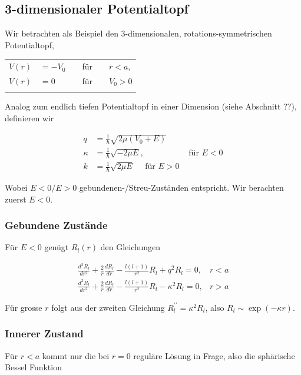 \documentclass[10pt, letterpaper]{article}
\begin{document}
\subsection*{3-dimensionaler Potentialtopf}
Wir betrachten als Beispiel den 3-dimensionalen, rotations-symmetrischen Potentialtopf,

\begin{center}
\begin{tabular}{rlrlrl}
$V(r)$ & $=-V_{0}$ &  & für &  & $r<a$, \\
$V(r)$ & $=0$ &  & für &  & $V_{0}>0$ \\
 &  &  &  &  &  \\
\hline
\end{tabular}
\end{center}

Analog zum endlich tiefen Potentialtopf in einer Dimension (siehe Abschnitt ??), definieren wir

$$
\begin{array}{rlr}
q & =\frac{1}{\hbar} \sqrt{2 \mu\left(V_{0}+E\right)} & \\
\kappa & =\frac{1}{\hbar} \sqrt{-2 \mu E}, & \text { für } E<0 \\
k & =\frac{1}{\hbar} \sqrt{2 \mu E} \quad \text { für } E>0
\end{array}
$$

Wobei $E<0 / E>0$ gebundenen-/Streu-Zuständen entspricht. Wir berachten zuerst $E<0$.

\subsubsection*{Gebundene Zustände}
Für $E<0$ genügt $R_{l}(r)$ den Gleichungen

$$
\begin{array}{ll}
\frac{d^{2} R_{l}}{d r^{2}}+\frac{2}{r} \frac{d R_{l}}{d r}-\frac{l(l+1)}{r^{2}} R_{l}+q^{2} R_{l}=0, & r<a \\
\frac{d^{2} R_{l}}{d r^{2}}+\frac{2}{r} \frac{d R_{l}}{d r}-\frac{l(l+1)}{r^{2}} R_{l}-\kappa^{2} R_{l}=0, & r>a
\end{array}
$$

Für grosse $r$ folgt aus der zweiten Gleichung $R_{l}^{\prime \prime}=\kappa^{2} R_{l}$, also $R_{l} \sim \exp (-\kappa r)$.

\subsubsection*{Innerer Zustand}
Für $r<a$ kommt nur die bei $r=0$ reguläre Lösung in Frage, also die sphärische Bessel Funktion
\end{document}
